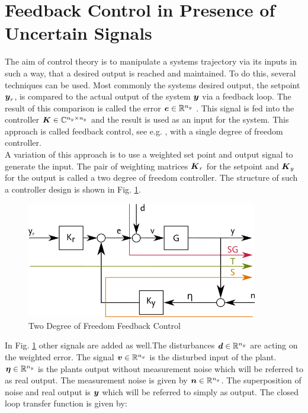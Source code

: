 \section{Feedback Control in Presence of Uncertain Signals}

The aim of control theory is to manipulate a systems trajectory via its inputs in such a way, that a desired output is reached and maintained. To do this, several techniques can be used. Most commonly the systems desired output, the setpoint $\mbox{\boldmath$y$}_r$, is compared to the actual output of the system $\mbox{\boldmath$y$}$ via a feedback loop. The result of this comparison is called the error $\mbox{\boldmath$e$} \in \mathbb{R}^{n_y}$ . This signal is fed into the controller $\mbox{\boldmath$K$} \in \mathbb{C}^{n_y \times n_y}$  and the result is used as an input for the system. This approach is called feedback control, see e.g. \cite{Astrom2009FeedbackEngineers}, with a single degree of freedom controller.\\

A variation of this approach is to use a weighted set point and output signal to generate the input. The pair of weighting matrices $\mbox{\boldmath$K$}_r$  for the setpoint and $\mbox{\boldmath$K$}_y$ for the output is called a two degree of freedom controller. The structure of such a controller design is shown in Fig. \ref{c:control:f:2dofclosedloop}.

\begin{figure}[H]
\begin{minipage}[b]{\textwidth}
\centering
\includegraphics[width=0.9\textwidth]{./Graphics/2DOFCLOSEDLOOP.png}
\caption{Two Degree of Freedom Feedback Control}
\label{c:control:f:2dofclosedloop}
\end{minipage}
\end{figure}

In Fig. \ref{c:control:f:2dofclosedloop} other signals are added as well.The disturbances $\mbox{\boldmath$d$} \in \mathbb{R}^{n_y}$ are acting on the weighted error. The signal $\mbox{\boldmath$v$} \in \mathbb{R}^{n_y}$ is the disturbed input of the plant. $\mbox{\boldmath$\eta$} \in \mathbb{R}^{n_y}$ is the plants output without measurement noise which will be referred to as real output. The measurement noise is given by $\mbox{\boldmath$n$} \in \mathbb{R}^{n_y}$. The superposition of noise and real output is $\mbox{\boldmath$y$}$ which will be referred to simply as output. The closed loop transfer function is given by:

